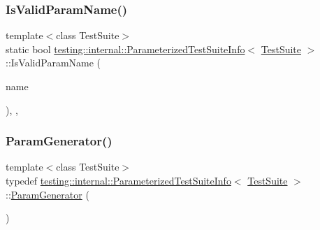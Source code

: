 \subsubsection{\texorpdfstring{Is\+Valid\+Param\+Name()}{IsValidParamName()}}
{\footnotesize\ttfamily template$<$class Test\+Suite$>$ \\
static bool \hyperlink{classtesting_1_1internal_1_1ParameterizedTestSuiteInfo}{testing\+::internal\+::\+Parameterized\+Test\+Suite\+Info}$<$ \hyperlink{classtesting_1_1TestSuite}{Test\+Suite} $>$\+::Is\+Valid\+Param\+Name (\begin{DoxyParamCaption}\item[{const std\+::string \&}]{name }\end{DoxyParamCaption})\hspace{0.3cm}{\ttfamily [inline]}, {\ttfamily [static]}, {\ttfamily [private]}}

\mbox{\label{classtesting_1_1internal_1_1ParameterizedTestSuiteInfo_ac6230057c507d74e373233edbf0410c2}} 
\subsubsection{\texorpdfstring{Param\+Generator()}{ParamGenerator()}}
{\footnotesize\ttfamily template$<$class Test\+Suite$>$ \\
typedef \hyperlink{classtesting_1_1internal_1_1ParameterizedTestSuiteInfo}{testing\+::internal\+::\+Parameterized\+Test\+Suite\+Info}$<$ \hyperlink{classtesting_1_1TestSuite}{Test\+Suite} $>$\+::\hyperlink{classtesting_1_1internal_1_1ParamGenerator}{Param\+Generator} (\begin{DoxyParamCaption}\item[{Generator\+Creation\+Func}]{ }\end{DoxyParamCaption})}

\mbox{\label{classtesting_1_1internal_1_1ParameterizedTestSuiteInfo_a8c0af866d3c291a63d3f4581ccd452d1}} 
